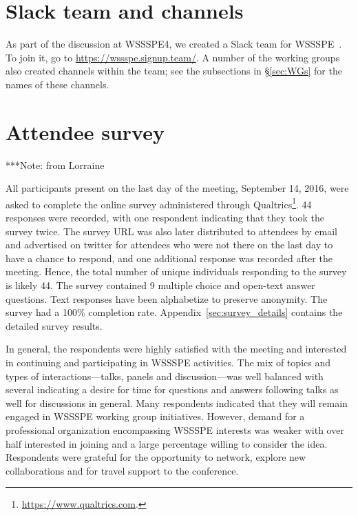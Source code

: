 \documentclass[11pt, oneside]{amsart}
\newcommand{\todo}[1]{{\color{blue}$\blacksquare$~\textsf{[TODO: #1]}}}
\newcommand{\note}[1]{ {\textcolor{blueish}    { ***Note:      #1 }}}
\begin{document}














\section{Slack team and channels}\label{sec:slack}


As part of the discussion at WSSSPE4, we created a Slack team for WSSSPE~\cite{WSSSPESlack}.  To join it, go to \url{https://wssspe.signup.team/}.  A number of the working groups also created channels within the team; see the subsections in \S\ref{sec:WGs} for the names of these channels.


\section{Attendee survey \label{sec:survey}}

\note{from Lorraine}

All participants present on the last day of the meeting, September 14, 2016, were asked to complete the online survey administered through Qualtrics\footnote{\url{https://www.qualtrics.com}.}.
44 responses were recorded, with one respondent indicating that they took the survey twice.
The survey URL was also later distributed to attendees by email and advertised on twitter for attendees who were not there on the last day to have a chance to respond, and one additional response was recorded after the meeting.
Hence, the total number of unique individuals responding to the survey is likely 44.
The survey contained 9 multiple choice and open-text answer questions.
Text responses have been alphabetize to preserve anonymity.
The survey had a 100\% completion rate.
Appendix~\ref{sec:survey_details} contains the detailed survey results.

In general, the respondents were highly satisfied with the meeting and interested in continuing and participating in WSSSPE activities.
The mix of topics and types of interactions---talks, panels and discussion---was well balanced with several indicating a desire for time for questions and answers following talks as well for discussions in general.
Many respondents indicated that they will remain engaged in WSSSPE working group initiatives.
However, demand for a professional organization encompassing WSSSPE interests was weaker with over half interested in joining and a large percentage willing to consider the idea.
Respondents were grateful for the opportunity to network, explore new collaborations and for travel support to the conference.
\end{document}
